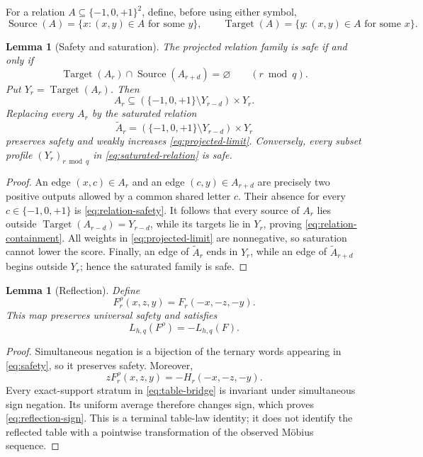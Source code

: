 \documentclass[11pt]{article}
\newtheorem{lemma}[theorem]{Lemma}
\theoremstyle{definition}
\theoremstyle{remark}
\newcommand{\T}{\{-1,0,+1\}}
\newcommand{\Target}{\operatorname{Target}}
\newcommand{\Source}{\operatorname{Source}}
\begin{document}
For a relation \(A\subseteq\T^2\), define, before using either symbol,
\[
 \Source(A)=\{x:(x,y)\in A\text{ for some }y\},\qquad
 \Target(A)=\{y:(x,y)\in A\text{ for some }x\}.
\]

\begin{lemma}[Safety and saturation]
\label{lem:saturation}
The projected relation family is safe if and only if
\begin{equation}
 \Target(A_r)\cap\Source(A_{r+d})=\varnothing
 \qquad(r\bmod q).
 \label{eq:relation-safety}
\end{equation}
Put \(Y_r=\Target(A_r)\).  Then
\begin{equation}
 A_r\subseteq(\T\setminus Y_{r-d})\times Y_r.
 \label{eq:relation-containment}
\end{equation}
Replacing every \(A_r\) by the saturated relation
\begin{equation}
 \widetilde A_r=(\T\setminus Y_{r-d})\times Y_r
 \label{eq:saturated-relation}
\end{equation}
preserves safety and weakly increases \eqref{eq:projected-limit}.
Conversely, every subset profile \((Y_r)_{r\bmod q}\) in
\eqref{eq:saturated-relation} is safe.
\end{lemma}

\begin{proof}
An edge \((x,c)\in A_r\) and an edge \((c,y)\in A_{r+d}\) are precisely
two positive outputs allowed by a common shared letter \(c\).  Their
absence for every \(c\in\T\) is \eqref{eq:relation-safety}.  It follows
that every source of \(A_r\) lies outside
\(\Target(A_{r-d})=Y_{r-d}\), while its targets lie in \(Y_r\), proving
\eqref{eq:relation-containment}.  All weights in
\eqref{eq:projected-limit} are nonnegative, so saturation cannot lower
the score.  Finally, an edge of \(\widetilde A_r\) ends in \(Y_r\), while
an edge of \(\widetilde A_{r+d}\) begins outside \(Y_r\); hence the
saturated family is safe.
\end{proof}

\begin{lemma}[Reflection]
\label{lem:reflection}
Define
\[
 F^\rho_r(x,z,y)=F_r(-x,-z,-y).
\]
This map preserves universal safety and satisfies
\begin{equation}
 L_{h,q}(F^\rho)=-L_{h,q}(F).
 \label{eq:reflection-sign}
\end{equation}
\end{lemma}

\begin{proof}
Simultaneous negation is a bijection of the ternary words appearing in
\eqref{eq:safety}, so it preserves safety.  Moreover,
\[
 zF^\rho_r(x,z,y)=-H_r(-x,-z,-y).
\]
Every exact-support stratum in \eqref{eq:table-bridge} is invariant under
simultaneous sign negation.  Its uniform average therefore changes sign,
which proves \eqref{eq:reflection-sign}.  This is a terminal table-law
identity; it does not identify the reflected table with a pointwise
transformation of the observed M\"obius sequence.
\end{proof}
\end{document}
